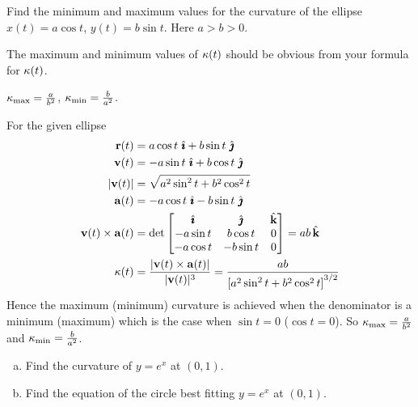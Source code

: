 \begin{question}
 Find the minimum and maximum values for the curvature of
the ellipse $x(t)= a \cos t$, $y(t)=b\sin t$. Here $a>b>0$.
\end{question}

\begin{hint} 
The maximum and minimum values of $\kappa(t)$ should be
obvious from your formula for $\kappa(t)$.
\end{hint}

\begin{answer} 
$\kappa_{\rm max}=\frac{a}{b^2}$, $\kappa_{\rm min}=\frac{b}{a^2}$.
\end{answer}

\begin{solution} 
 For the given ellipse
\begin{align*}
\mathbf{r}(t)&= a\cos t\ \hat{\pmb{\imath}} +b\sin t\ \hat{\pmb{\jmath}} \\
\mathbf{v}(t)&= -a\sin t\ \hat{\pmb{\imath}} +b\cos t\ \hat{\pmb{\jmath}} \\
|\mathbf{v}(t)|& = \sqrt{a^2\sin^2t+b^2\cos^2 t}\\
\mathbf{a}(t)&= -a\cos t\ \hat{\pmb{\imath}} -b\sin t\ \hat{\pmb{\jmath}} \\
\mathbf{v}(t)\times\mathbf{a}(t) &=\det\left[\begin{matrix} \hat{\pmb{\imath}} & \hat{\pmb{\jmath}} & \hat{\mathbf{k}} \\
                                        -a\sin t & b\cos t & 0 \\
                                        -a\cos t & -b\sin t & 0 
                                    \end{matrix}\right]
= ab\,\hat{\mathbf{k}}\\
\kappa(t)&=\frac{|\mathbf{v}(t)\times\mathbf{a}(t)|}{|\mathbf{v}(t)|^3}
=\frac{ab}{{[a^2\sin^2t+b^2\cos^2 t]}^{3/2}}
\end{align*}
Hence the maximum (minimum) curvature is achieved when the denominator
is a minimum (maximum) which is the case when $\sin t =0$ ($\cos t=0$).
So $\kappa_{\rm max}=\frac{a}{b^2}$ and $\kappa_{\rm min}=\frac{b}{a^2}$.
\end{solution}




\begin{question}[M317 2018A] %
\begin{enumerate}[(a)]
\item 
Find the curvature of $y=e^x$ at $(0,1)$.
\item
Find the equation of the circle best fitting $y=e^x$
at $(0,1)$.
\end{enumerate}
\end{question}

